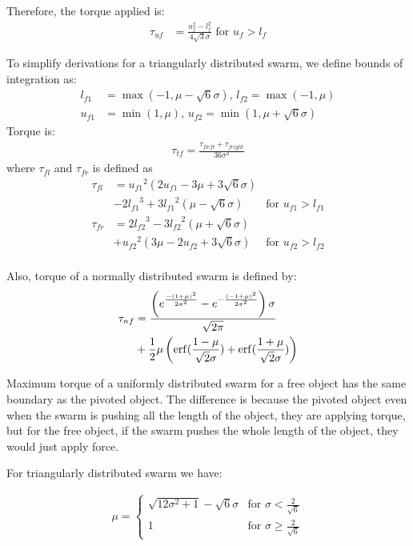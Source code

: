 Therefore, the torque applied is:
\begin{align}
\tau_{uf} &= \frac{u_f^2-l_f^2}{4\sqrt{3}\sigma} \textrm{  for    }  u_f>l_f
\end{align}

To simplify derivations for a triangularly distributed swarm, we define bounds of integration as:
\begin{align}
l_{f1} &= \max({-1,\mu-\sqrt{6}\sigma}), \,l_{f2} = \max({-1,\mu})\\ \nonumber
u_{f1} &= \min({1,\mu}), \, u_{f2} = \min({1,\mu+\sqrt{6}\sigma}) \nonumber
\end{align}
Torque is:
\begin{align}
\tau_{tf} = \frac{\tau_{fleft}+ \tau_{fright}}{36\sigma^2}
\end{align}
where $\tau_{fl}$ and $\tau_{fr}$ is defined as
\begin{align}\nonumber
\tau_{fl} &=  {u_{f1}}^2(2u_{f1} - 3\mu+3\sqrt{6}\sigma)\\ \nonumber
&-2{l_{f1}}^3+3{l_{f1}}^2(\mu-\sqrt{6}\sigma) &   \textrm{for     } u_{f1} > l_{f1}\\ \nonumber
\tau_{fr} &= 2{l_{f2}}^3-3{l_{f2}}^2(\mu+\sqrt{6}\sigma)\\ \nonumber
&+{u_{f2}}^2( 3\mu-2u_{f2}+3\sqrt{6}\sigma) &   \textrm{for     } u_{f2} > l_{f2}\\ \nonumber
\end{align}

Also, torque of a normally distributed swarm is defined by:
\begin{align} \nonumber
\tau_{nf} &= \frac{\left(e^{\frac{-(1+\mu)^2}{2\sigma^2}}-e^{-\frac{(-1+\mu)^2}{2\sigma^2}}\right)\sigma}{\sqrt{2\pi}}\\
 &+ \frac{1}{2}\mu\left(\operatorname{erf}(\frac{1-\mu}{\sqrt{2}\sigma})+\operatorname{erf}(\frac{1+\mu}{\sqrt{2}\sigma})\right) 
\end{align}

Maximum torque of a uniformly distributed swarm for a free object has the same boundary as the pivoted object. The difference is because the pivoted object even when the swarm is pushing all the length of the object, they are applying torque, but for the free object, if the swarm pushes the whole length of the object, they would just apply force.

For triangularly distributed swarm we have:

\begin{align}
\mu= \left\{
\begin{array}{ll}
 \sqrt{12\sigma^2 +1}  -\sqrt{6}\sigma &   \textrm{for     }  \sigma  <\frac{2}{\sqrt{6}} \\
1 &   \textrm{for     } \sigma \geq \frac{2}{\sqrt{6}} 
\end{array} 
\right.
\end{align}


